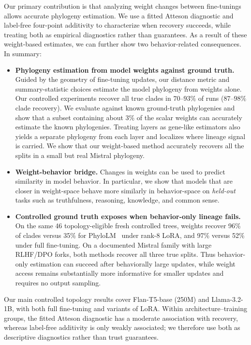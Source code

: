 \documentclass{article}
\theoremstyle{definition}
\theoremstyle{plain}
\begin{document}
Our primary contribution is that analyzing weight changes between fine-tunings allows accurate phylogeny estimation. We use a fitted Atteson diagnostic and label-free four-point additivity to characterize when recovery succeeds, while treating both as empirical diagnostics rather than guarantees. As a result of these weight-based estimates, we can further show two behavior-related consequences. In summary:
\begin{itemize}[leftmargin=1.3em,itemsep=1pt,topsep=2pt,parsep=0pt]
  \item \textbf{Phylogeny estimation from model weights against ground truth.} Guided by the geometry of
    fine-tuning updates, our distance metric and summary-statistic choices estimate the model phylogeny from
    weights alone. Our controlled experiments recover all true clades in $70$--$93\%$ of runs
    ($87$--$98\%$ clade recovery). We evaluate against known ground-truth phylogenies and show that a subset containing about 3\% of the scalar weights can accurately estimate the known phylogenies. Treating layers as gene-like estimators also yields a separate phylogeny from each layer and localizes where lineage signal is carried. We show that our weight-based method accurately recovers all the splits in a small but real Mistral phylogeny.
  \item \textbf{Weight-behavior bridge.} Changes in weights can be used to predict similarity in model behavior.  In particular, we show that models that are closer in weight-space behave more similarly in behavior-space on \textit{held-out} tasks such as truthfulness, reasoning, knowledge, and common sense.
  \item \textbf{Controlled ground truth exposes when behavior-only lineage fails.}
    On the same 46 topology-eligible fresh controlled trees, weights recover 96\% of clades versus 35\% for
PhyloLM~\citep{yax2025phylolm} under rank-8 LoRA, and 97\% versus 52\% under full fine-tuning.
    On a documented Mistral family with large RLHF/DPO forks, both methods recover all three true splits. Thus behavior-only estimation can succeed after behaviorally large
    updates, while weight access remains substantially more informative for smaller updates and
    requires no output sampling.
\end{itemize}
Our main controlled topology results cover Flan-T5-base (250M) and Llama-3.2-1B, with both full
fine-tuning and variants of LoRA. Within architecture--training groups, the fitted Atteson diagnostic
has a moderate association with recovery, whereas label-free additivity is only weakly associated;
we therefore use both as descriptive diagnostics rather than trust guarantees.
\end{document}
